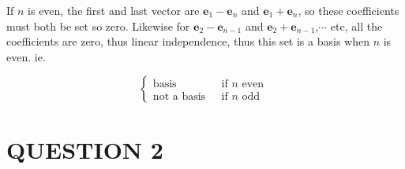 \documentclass[a4paper]{article}
\begin{document}
\begin{enumerate}[label = (\alph*)]
		If $ n $ is even, the first and last vector are $ \mathbf{e}_{1} - \mathbf{e}_{n} $ and $ \mathbf{e}_{1} + \mathbf{e}_{n} $, so these coefficients must both be set so zero. Likewise for $ \mathbf{e}_{2} - \mathbf{e}_{n-1} $ and $ \mathbf{e}_{2} + \mathbf{e}_{n-1} $,$ \cdots $ etc, all the coefficients are zero, thus linear independence, thus this set is a basis when $ n $ is even. ie.
		
			\[ \begin{cases} \text{basis }  & \text{ if } n \text{ even } \\ \text{not a basis } &  \text{ if } n \text{ odd} \end{cases} \]
		
	\end{enumerate}
	
	
	\section{QUESTION 2}
	
\end{document}
